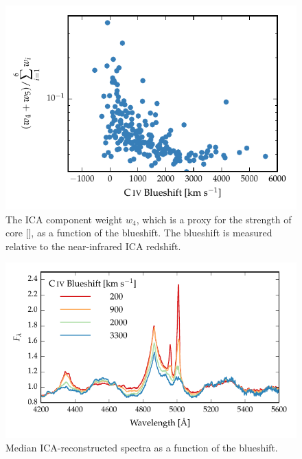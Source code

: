 \begin{figure}
    \centering
    \includegraphics[width=\textwidth]{figures/chapter04/civ_blueshift_oiii_strength.pdf} 
    \caption[{The ICA component weight $w_4$, which is a proxy for the strength of core [], as a function of the  blueshift.}]{The ICA component weight $w_4$, which is a proxy for the strength of core [], as a function of the  blueshift. The  blueshift is measured relative to the near-infrared ICA redshift. }     
    \label{fig:civ_blueshift_oiii_strength}
\end{figure}

\begin{figure}
    \centering
    \includegraphics[width=\columnwidth]{figures/chapter04/mfica_composites.pdf} 
    \caption[{Median ICA-reconstructed spectra as a function of the  blueshift.}]{Median ICA-reconstructed spectra as a function of the  blueshift.}     
    \label{fig:mfica_composites}
\end{figure}

